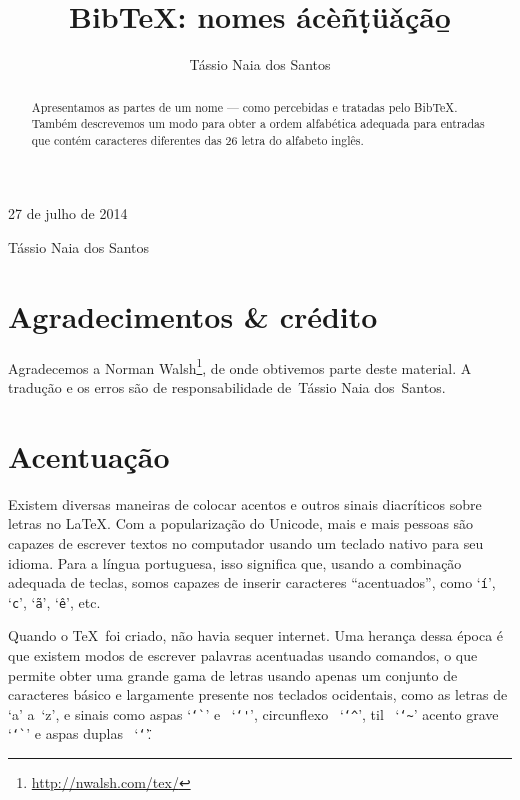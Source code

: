 \documentclass[article,openany]{memoir}
\title{Bib\TeX: nomes ácèñ\d{t}ü\v{a}çã\b{o}}
\author{Tássio Naia dos Santos}
\newcommand*{\as}[1]{%
  `\thinspace\texttt{#1}\thinspace'}
\begin{document}



\hfill 27 de julho de 2014

\medskip

\noindent Tássio Naia dos Santos



\bigskip

\begin{abstract}
Apresentamos as partes de um nome --- como percebidas e tratadas pelo
Bib\TeX. Também descrevemos um modo para obter a ordem alfabética
adequada para entradas que contém caracteres diferentes das 26 letra
do alfabeto inglês.
\end{abstract}


\chapter*{Agradecimentos \& crédito}

Agradecemos a Norman Walsh\footnote{\url{http://nwalsh.com/tex/}}, de
onde obtivemos parte deste material. A tradução e os erros são de
responsabilidade de~Tássio Naia dos~Santos.



\chapter{Acentuação}

Existem diversas maneiras de colocar acentos e outros sinais
diacríticos sobre letras no \LaTeX. Com a popularização do Unicode,
mais e mais pessoas são capazes de escrever textos no computador
usando um teclado nativo para seu idioma. Para a língua portuguesa,
isso significa que, usando a combinação adequada de teclas, somos
capazes de inserir caracteres ``acentuados'', como \as{í}, \as{c},
\as{ã}, \as{ê}, etc.

Quando o \TeX\ foi criado, não havia sequer internet. Uma herança
dessa época é que existem modos de escrever palavras acentuadas usando
comandos, o que permite obter uma grande gama de letras usando apenas
um conjunto de caracteres básico e largamente presente nos teclados
ocidentais, como as letras de `a' a~`z', e sinais como aspas
\as{\char`\`} e~\as{\char`\'}, circunflexo~\as{\char`\^},
til~\as{\char`\~} acento grave~\as{\char`\`} e aspas duplas~\as{\char`\"}.
\end{document}
